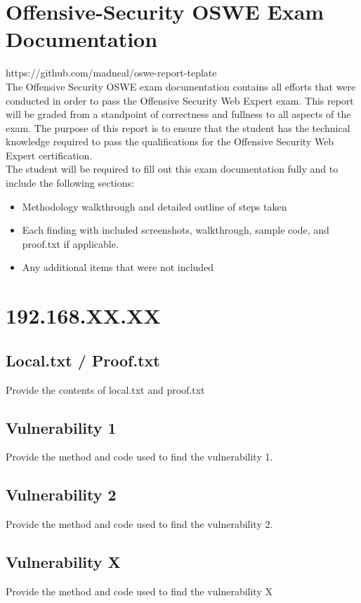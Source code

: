 \documentclass[a4paper]{article}
\begin{document}
\section{Offensive-Security OSWE Exam Documentation}

https://github.com/madneal/oswe-report-teplate
\\

The Offensive Security OSWE exam documentation contains all efforts that were conducted in order to pass the Offensive Security Web Expert exam. This report will be graded from a standpoint of correctness and fullness to all aspects of the exam. The purpose of this report is to ensure that the student has the technical knowledge required to pass the qualifications for the Offensive Security Web Expert certification.
\\
The student will be required to fill out this exam documentation fully and to include the following sections:

\begin{itemize}
  \item Methodology walkthrough and detailed outline of steps taken
  \item Each finding with included screenshots, walkthrough, sample code, and proof.txt if applicable.
  \item Any additional items that were not included
\end{itemize}

\section{192.168.XX.XX}

\subsection{Local.txt / Proof.txt }
Provide the contents of local.txt and proof.txt

\subsection{Vulnerability 1}
Provide the method and code used to find the vulnerability 1.

\subsection{Vulnerability 2}
Provide the method and code used to find the vulnerability 2.

\subsection{Vulnerability X}
Provide the method and code used to find the vulnerability X
\end{document}
